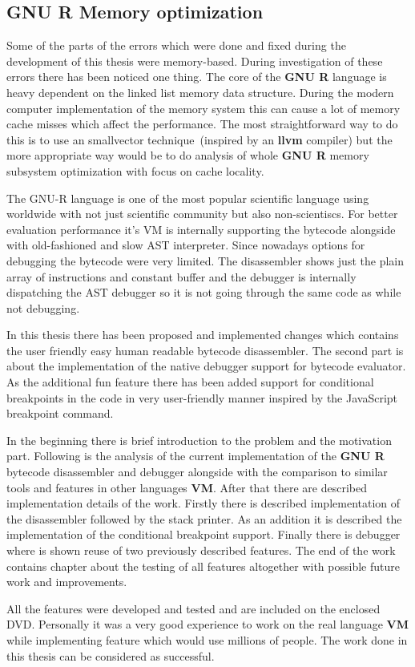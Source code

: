 \documentclass[thesis=M,english]{FITthesis}[2018/10/20]
\begin{document}
\subsection{GNU R Memory optimization}

Some of the parts of the errors which were done and fixed during the development of this thesis were memory-based. During investigation of these errors there has been noticed one thing. The core of the \textbf{GNU R} language is heavy dependent on the linked list memory data structure. During the modern computer implementation of the memory system this can cause a lot of memory cache misses which affect the performance. The most straightforward way to do this is to use an smallvector technique~(inspired by an \textbf{llvm} compiler) but the more appropriate way would be to do analysis of whole \textbf{GNU R} memory subsystem optimization with focus on cache locality.

\begin{conclusion}

The GNU-R language is one of the most popular scientific language using worldwide with not just scientific community but also non-scientiscs. For better evaluation performance it's VM is internally supporting the bytecode alongside with old-fashioned and slow AST interpreter. Since nowadays options for debugging the bytecode were very limited. The disassembler shows just the plain array of instructions and constant buffer and the debugger is internally dispatching the AST debugger so it is not going through the same code as while not debugging. 

In this thesis there has been proposed and implemented changes which contains the user friendly easy human readable bytecode disassembler. The second part is about the implementation of the native debugger support for bytecode evaluator. As the additional fun feature there has been added support for conditional breakpoints in the code in very user-friendly manner inspired by the JavaScript breakpoint command.

In the beginning there is brief introduction to the problem and the motivation part. Following is the analysis of the current implementation of the \textbf{GNU R} bytecode disassembler and debugger alongside with the comparison to similar tools and features in other languages \textbf{VM}. After that there are described implementation details of the work. Firstly there is described implementation of the disassembler followed by the stack printer. As an addition it is described the implementation of the conditional breakpoint support. Finally there is debugger where is shown reuse of two previously described features. The end of the work contains chapter about the testing of all features altogether with possible future work and improvements.

All the features were developed and tested and are included on the enclosed DVD. Personally it was a very good experience to work on the real language \textbf{VM} while implementing feature which would use millions of people. The work done in this thesis can be considered as successful.

\end{conclusion}
\end{document}
